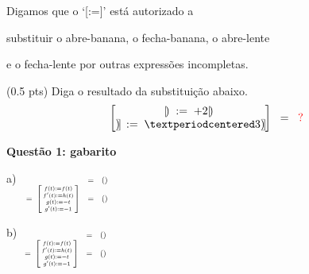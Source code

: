 \documentclass[oneside,12pt]{article}
\begin{document}
\msk

Digamos que  o `[:=]' está autorizado a

substituir o abre-banana, o fecha-banana, o abre-lente

e o fecha-lente por outras expressões incompletas.

\msk

\B(0.5 pts) Diga o resultado da substituição abaixo.
%
$$\ga{PBL} \bmat{
    \; |\!) \; := \; + 2 |\!) \;\; \\
    \rbparen \; := \; ·3 \rbparen \\
  } \;\;=\;\; \rq
$$



\newpage


{\bf Questão 1: gabarito}


a)
%
$\scalebox{0.7}{$
 \begin{array}[t]{rcl}
  \ga{Alface} &=& \TFCP{\ga{ALFACE}} \\
  \ga{Tomate} \; = \; \ga{Alface}
                  \bsm{f(t) := f(t) \\
                       f'(t) := h(t) \\
                       g(t) := -t \\
                       g'(t) := -1 \\
                      }
              &=& \TFCP{\ga{TOMATE2}} \\
 \end{array}
 $}
$


b)
%
$\scalebox{0.7}{$
 \begin{array}[t]{rcl}
  \ga{Emv1} &=& \TFCP{\ga{EMV1}} \\
  \ga{Repolho} = \; \ga{Emv1}
                  \bsm{f(t) := f(t) \\
                       f'(t) := h(t) \\
                       g(t) := -t \\
                       g'(t) := -1 \\
                      }
              &=& \TFCP{\ga{REPOLHO}} \\
 \end{array}
 $}
$
\end{document}
